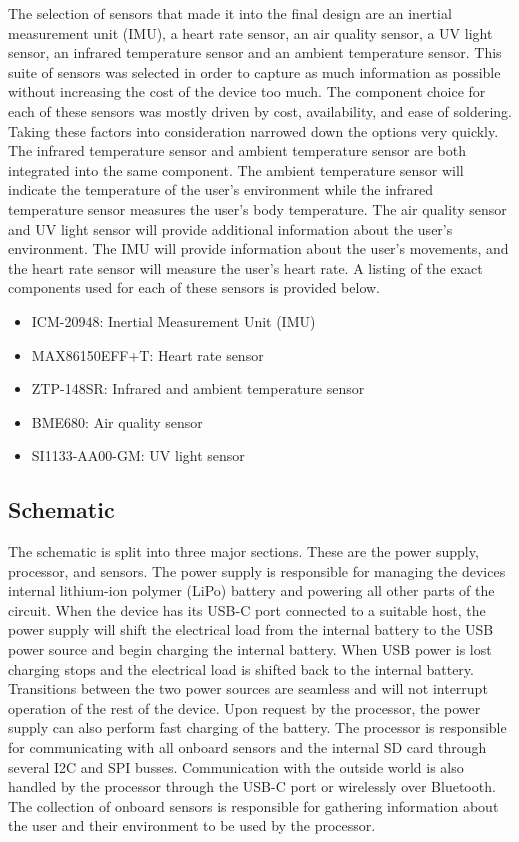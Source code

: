 The selection of sensors that made it into the final design are an inertial 
measurement unit (IMU), a heart rate sensor, an air quality sensor, a UV light 
sensor, an infrared temperature sensor and an ambient temperature sensor. This 
suite of sensors was selected in order to capture as much information as 
possible without increasing the cost of the device too much. The component 
choice for each of these sensors was mostly driven by cost, availability, and 
ease of soldering. Taking these factors into consideration narrowed down the 
options very quickly. The infrared temperature sensor and ambient temperature 
sensor are both integrated into the same component. The ambient temperature 
sensor will indicate the temperature of the user’s environment while the 
infrared temperature sensor measures the user’s body temperature. The air 
quality sensor and UV light sensor will provide additional information about 
the user’s environment. The IMU will provide information about the user’s 
movements, and the heart rate sensor will measure the user’s heart rate. A 
listing of the exact components used for each of these sensors is provided 
below.

\begin{itemize}
   \item ICM-20948: Inertial Measurement Unit (IMU)
   \item MAX86150EFF+T: Heart rate sensor
   \item ZTP-148SR: Infrared and ambient temperature sensor
   \item BME680: Air quality sensor
   \item SI1133-AA00-GM: UV light sensor
\end{itemize}

\subsection{Schematic}

The schematic is split into three major sections. These are the power supply, 
processor, and sensors. The power supply is responsible for managing the 
devices internal lithium-ion polymer (LiPo) battery and powering all other 
parts of the circuit. When the device has its USB-C port connected to a 
suitable host, the power supply will shift the electrical load from the 
internal battery to the USB power source and begin charging the internal 
battery. When USB power is lost charging stops and the electrical load is 
shifted back to the internal battery. Transitions between the two power 
sources are seamless and will not interrupt operation of the rest of the 
device. Upon request by the processor, the power supply can also perform fast 
charging of the battery. The processor is responsible for communicating with 
all onboard sensors and the internal SD card through several I2C and SPI 
busses. Communication with the outside world is also handled by the processor 
through the USB-C port or wirelessly over Bluetooth. The collection of onboard 
sensors is responsible for gathering information about the user and their 
environment to be used by the processor.

